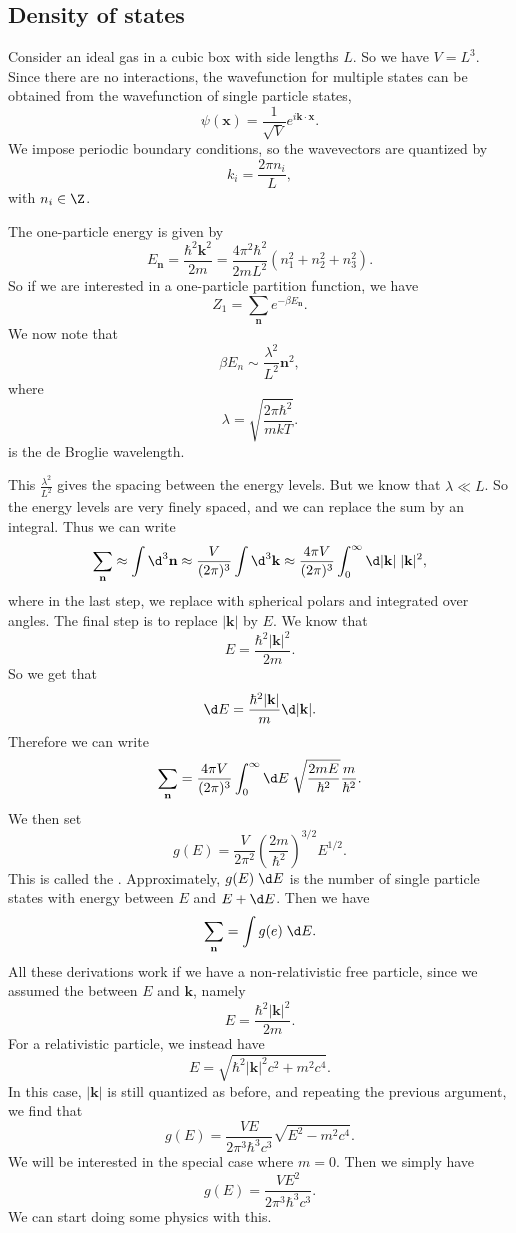 \documentclass[a4paper]{article}
\begin{document}
\subsection{Density of states}
Consider an ideal gas in a cubic box with side lengths $L$. So we have $V = L^3$. Since there are no interactions, the wavefunction for multiple states can be obtained from the wavefunction of single particle states,
\[
  \psi(\mathbf{x}) = \frac{1}{\sqrt{V}} e^{i\mathbf{k}\cdot \mathbf{x}}.
\]
We impose periodic boundary conditions, so the wavevectors are quantized by
\[
  k_i = \frac{2\pi n_i}{L},
\]
with $n_i \in \Z$.

The one-particle energy is given by
\[
  E_\mathbf{n} = \frac{\hbar^2 \mathbf{k}^2}{2m} = \frac{4\pi^2 \hbar^2}{2mL^2}(n_1^2 + n_2^2 + n_3^2).
\]
So if we are interested in a one-particle partition function, we have
\[
  Z_1 = \sum_\mathbf{n} e^{-\beta E_\mathbf{n}}.
\]
We now note that
\[
  \beta E_n \sim \frac{\lambda^2}{L^2}\mathbf{n}^2,
\]
where
\[
  \lambda = \sqrt{\frac{2\pi \hbar^2}{mkT}}.
\]
is the de Broglie wavelength.

This $\frac{\lambda^2}{L^2}$ gives the spacing between the energy levels. But we know that $\lambda \ll L$. So the energy levels are very finely spaced, and we can replace the sum by an integral. Thus we can write
\[
  \sum_\mathbf{n} \approx \int \d^3 \mathbf{n} \approx \frac{V}{(2\pi)^3} \int \d^3 \mathbf{k} \approx \frac{4\pi V}{(2\pi)^3} \int_0^\infty \d |\mathbf{k}|\; |\mathbf{k}|^2,
\]
where in the last step, we replace with spherical polars and integrated over angles. The final step is to replace $|\mathbf{k}|$ by $E$. We know that
\[
  E = \frac{\hbar^2 |\mathbf{k}|^2}{2m}.
\]
So we get that
\[
  \d E = \frac{\hbar^2 |\mathbf{k}|}{m} \d |\mathbf{k}|.
\]
Therefore we can write
\[
  \sum_\mathbf{n} = \frac{4\pi V}{(2\pi)^3} \int_0^\infty \d E\; \sqrt{\frac{2mE}{\hbar^2}}\frac{m}{\hbar^2}.
\]
We then set
\[
  g(E) = \frac{V}{2\pi^2} \left(\frac{2m}{\hbar^2}\right)^{3/2} E^{1/2}.
\]
This is called the . Approximately, $g(E) \;\d E$ is the number of single particle states with energy between $E$ and $E + \d E$. Then we have
\[
  \sum_\mathbf{n} = \int g(e)\;\d E.
\]
All these derivations work if we have a non-relativistic free particle, since we assumed the  between $E$ and $\mathbf{k}$, namely
\[
  E = \frac{\hbar^2 |\mathbf{k}|^2}{2m}.
\]
For a relativistic particle, we instead have
\[
  E = \sqrt{\hbar^2 |\mathbf{k}|^2 c^2 + m^2c^4}.
\]
In this case, $|\mathbf{k}|$ is still quantized as before, and repeating the previous argument, we find that
\[
  g(E) = \frac{VE}{2\pi^3 \hbar^3 c^3} \sqrt{E^2 - m^2 c^4}.
\]
We will be interested in the special case where $m = 0$. Then we simply have
\[
  g(E) = \frac{VE^2}{2\pi^3 \hbar^3 c^3}.
\]
We can start doing some physics with this.
\end{document}
